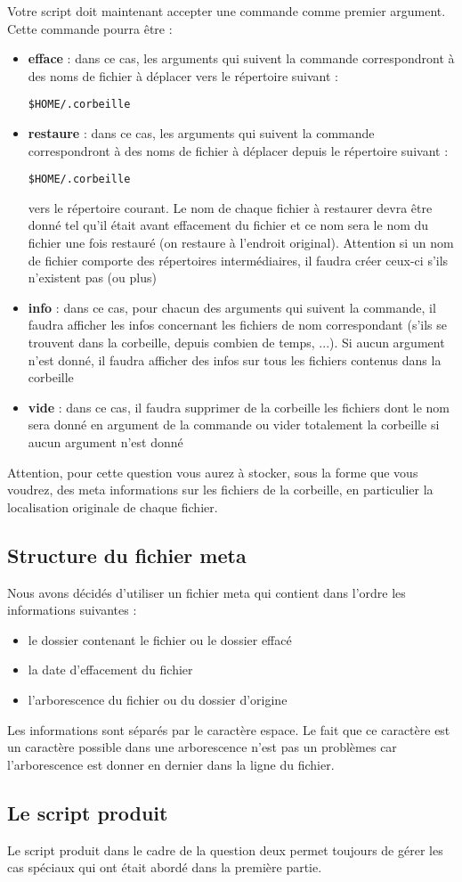 \documentclass[12pt, a4paper]{article}
\begin{document}
Votre script doit maintenant accepter une commande comme premier 
argument. Cette commande pourra être : 
\begin{itemize}
\item \textbf{efface} : dans ce cas, les arguments qui suivent la 
commande correspondront à des noms de fichier à déplacer vers le 
répertoire suivant :
\begin{lstlisting}
$HOME/.corbeille
\end{lstlisting}

\item \textbf{restaure} : dans ce cas, les arguments qui suivent la 
commande correspondront à des noms de fichier à déplacer depuis le 
répertoire suivant :
\begin{lstlisting}
$HOME/.corbeille
\end{lstlisting}
vers le répertoire courant. Le nom de chaque fichier à restaurer 
devra être donné tel qu'il était avant effacement du fichier et ce 
nom sera le nom du fichier une fois restauré (on restaure à 
l'endroit original). Attention si un nom de fichier comporte des 
répertoires intermédiaires, il faudra créer ceux-ci s'ils n'existent 
pas (ou plus)

\item \textbf{info} : dans ce cas, pour chacun des arguments qui 
suivent la commande, il faudra afficher les infos concernant les 
fichiers de nom correspondant (s'ils se trouvent dans la corbeille, 
depuis combien de temps, ...). Si aucun argument n'est donné, il 
faudra afficher des infos sur tous les fichiers contenus dans la 
corbeille

\item \textbf{vide} : dans ce cas, il faudra supprimer de la 
corbeille les fichiers dont le nom sera donné en argument de la 
commande ou vider totalement la corbeille si aucun argument n'est 
donné
\end{itemize}
Attention, pour cette question vous aurez à stocker, sous la forme 
que vous voudrez, des meta informations sur les fichiers de la 
corbeille, en particulier la localisation originale de chaque 
fichier. 

\subsection{Structure du fichier meta}

Nous avons décidés d'utiliser un fichier meta qui contient dans 
l'ordre les informations suivantes :
\begin{itemize}
	\item le dossier contenant le fichier ou le dossier effacé
	\item la date d'effacement du fichier
	\item l’arborescence du fichier ou du dossier d'origine
\end{itemize}
Les informations sont séparés par le caractère espace. Le fait que 
ce caractère est un caractère possible dans une arborescence n'est 
pas un problèmes car l'arborescence est donner en dernier dans la 
ligne du fichier.
\subsection{Le script produit}

Le script produit dans le cadre de la question deux permet toujours 
de gérer les cas spéciaux qui ont était abordé dans la première 
partie.
\end{document}
